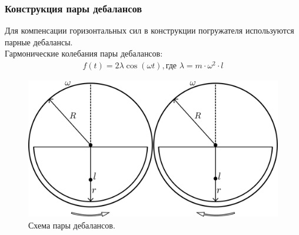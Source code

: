 \documentclass[10pt, pdf, hyperref={unicode}]{beamer}
\begin{document}
    \begin{frame}
        \frametitle{Конструкция пары дебалансов}
        \begin{center}
            \begin{minipage}[h]{0.97\linewidth}
                Для компенсации горизонтальных сил в конструкции погружателя используются парные дебалансы.\\
                Гармонические колебания пары дебалансов:
                \begin{equation}
                    \begin{gathered}
                        f(t) = 2 \lambda \cos (\omega t), \textrm{где } \lambda = m \cdot \omega^2 \cdot l
                    \end{gathered}
                \end{equation}
                \begin{figure}[h]
                    \centering
                    \includegraphics[width=0.52\linewidth]{../img/double_debalance.png}
                    \caption{Схема пары дебалансов.}
                \end{figure}
            \end{minipage}
        \end{center}
    \end{frame}
\end{document}
